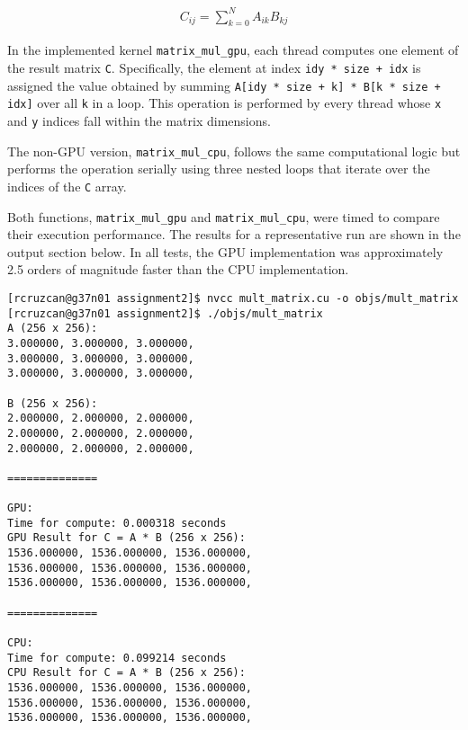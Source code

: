 \documentclass{article}
\begin{document}
\begin{align*}
    C_{ij} = \sum_{k=0}^N A_{ik}B_{kj}
\end{align*}

\noindent In the implemented kernel \texttt{matrix\_mul\_gpu}, each thread computes one element of the result matrix \texttt{C}. Specifically, the element at index \texttt{idy * size + idx} is assigned the value obtained by summing \texttt{A[idy * size + k] * B[k * size + idx]} over all \texttt{k} in a loop. This operation is performed by every thread whose \texttt{x} and \texttt{y} indices fall within the matrix dimensions.

The non-GPU version, \texttt{matrix\_mul\_cpu}, follows the same computational logic but performs the operation serially using three nested loops that iterate over the indices of the \texttt{C} array.

Both functions, \texttt{matrix\_mul\_gpu} and \texttt{matrix\_mul\_cpu}, were timed to compare their execution performance. The results for a representative run are shown in the output section below. In all tests, the GPU implementation was approximately 2.5 orders of magnitude faster than the CPU implementation.



\begin{lstlisting}[style=output]
[rcruzcan@g37n01 assignment2]$ nvcc mult_matrix.cu -o objs/mult_matrix
[rcruzcan@g37n01 assignment2]$ ./objs/mult_matrix
A (256 x 256):
3.000000, 3.000000, 3.000000, 
3.000000, 3.000000, 3.000000, 
3.000000, 3.000000, 3.000000, 

B (256 x 256):
2.000000, 2.000000, 2.000000, 
2.000000, 2.000000, 2.000000, 
2.000000, 2.000000, 2.000000, 

==============

GPU:
Time for compute: 0.000318 seconds
GPU Result for C = A * B (256 x 256):
1536.000000, 1536.000000, 1536.000000, 
1536.000000, 1536.000000, 1536.000000, 
1536.000000, 1536.000000, 1536.000000, 

==============

CPU:
Time for compute: 0.099214 seconds
CPU Result for C = A * B (256 x 256):
1536.000000, 1536.000000, 1536.000000, 
1536.000000, 1536.000000, 1536.000000, 
1536.000000, 1536.000000, 1536.000000, 
\end{lstlisting}
\end{document}
